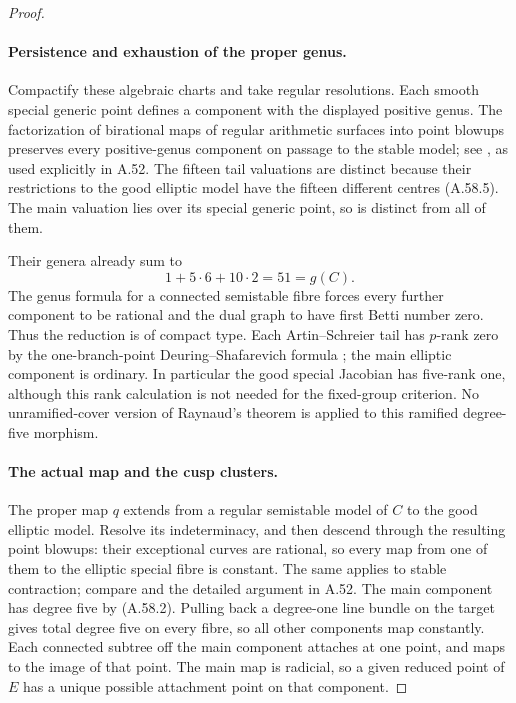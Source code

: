 \begin{proof}
\paragraph{Persistence and exhaustion of the proper genus.}
Compactify these algebraic charts and take regular
resolutions. Each smooth special generic point defines
a component with the displayed positive genus. The
factorization of birational maps of regular arithmetic
surfaces into point blowups preserves every positive-genus
component on passage to the stable model; see
\cite[Theorem 9.2.2 and Remark 9.2.6, pp.395--396,
Theorem 9.3.21, p.422]{fghLiu}, as used explicitly in A.52.
The fifteen tail valuations are distinct because their
restrictions to the good elliptic model have the fifteen
different centres (A.58.5). The main valuation lies over
its special generic point, so is distinct from all of them.

Their genera already sum to
\[
                         1+5\cdot6+10\cdot2=51=g(C).
                                                        \tag{A.58.12}
\]
The genus formula for a connected semistable fibre forces
every further component to be rational and the dual graph
to have first Betti number zero. Thus the reduction is of
compact type. Each Artin--Schreier tail has \(p\)-rank
zero by the one-branch-point Deuring--Shafarevich formula
\cite[Corollary 1.8, pp.35--36]{fghCrew1984};
the main elliptic component is ordinary. In particular the
good special Jacobian has five-rank one, although this
rank calculation is not needed for the fixed-group criterion.
No unramified-cover version of Raynaud's theorem is
applied to this ramified degree-five morphism.

\paragraph{The actual map and the cusp clusters.}
The proper map \(q\) extends from a regular semistable
model of \(C\) to the good elliptic model. Resolve its
indeterminacy, and then descend through the resulting
point blowups: their exceptional curves are rational,
so every map from one of them to the elliptic special
fibre is constant. The same applies to stable contraction;
compare \cite[Theorem 9.2.7, pp.396--397]{fghLiu} and
the detailed argument in A.52. The main component has
degree five by (A.58.2). Pulling back a degree-one line
bundle on the target gives total degree five on every
fibre, so all other components map constantly. Each
connected subtree off the main component attaches at one
point, and maps to the image of that point. The main
map is radicial, so a given reduced point of \(E\)
has a unique possible attachment point on that component.


\end{proof}
